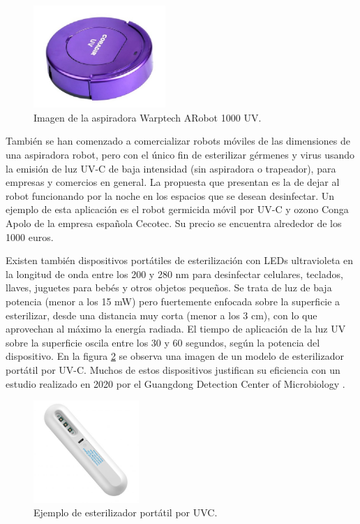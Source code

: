 \begin{figure}[h]
	\centering
	\includegraphics[width=5cm]{./Figures/coradiruv.jpg}
	\caption{Imagen de la aspiradora Warptech ARobot 1000 UV\protect\footnotemark.}
	\label{fig:coradiruv}
\end{figure}


También se han comenzado a comercializar  robots móviles de las dimensiones de una aspiradora robot, pero con el único fin de esterilizar gérmenes y virus usando la emisión de luz UV-C de baja intensidad (sin aspiradora o trapeador), para empresas y comercios en general. La propuesta que presentan es la de dejar al robot funcionando por la noche en los espacios que se desean desinfectar. Un ejemplo de esta aplicación es el robot germicida móvil por UV-C y ozono  Conga Apolo \citep{conga} de la empresa española Cecotec. Su precio se encuentra alrededor de los 1000 euros.

Existen también dispositivos portátiles de esterilización con LEDs ultravioleta en la longitud de onda entre los 200 y 280 nm para desinfectar celulares, teclados, llaves, juguetes para bebés y otros objetos pequeños. Se trata de luz de baja potencia (menor a los 15 mW) pero fuertemente enfocada sobre la superficie a esterilizar, desde una distancia muy corta (menor a los 3 cm), con lo que aprovechan al máximo la energía radiada. El tiempo de  aplicación de la luz UV sobre la superficie oscila entre los 30 y 60 segundos, según la potencia del dispositivo. En la figura \ref{fig:esterilizador} se observa una imagen de un modelo de esterilizador portátil por UV-C. Muchos de estos dispositivos justifican su eficiencia con un estudio realizado en 2020 por el Guangdong Detection Center of Microbiology \citep{Guangdong}.   


\begin{figure}[h]
	\centering
	\includegraphics[width=4cm]{./Figures/esterilizador.PNG}
	\caption{Ejemplo de esterilizador portátil por UVC\protect\footnotemark.}
	\label{fig:esterilizador}
\end{figure}






